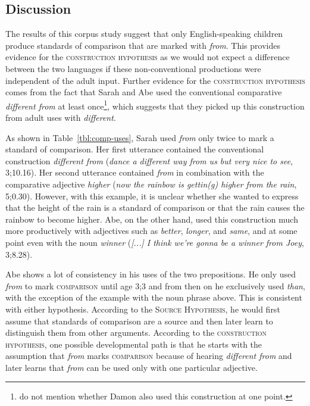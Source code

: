\documentclass[lucida]{sp} %
\begin{document}
\subsection{Discussion}

The results of this corpus study suggest that only English-speaking children produce standards of comparison that are marked with \textit{from}. This provides evidence for the \textsc{construction hypothesis} as we would not expect a difference between the two languages if these non-conventional productions were independent of the adult input. Further evidence for the \textsc{construction hypothesis} comes from the fact that Sarah and Abe used the conventional comparative \textit{different from} at least once\footnote{\cite{clark1989a} do not mention whether Damon also used this construction at one point.}, which suggests that they picked up this construction from adult uses with \textit{different}.

As shown in Table~\ref{tbl:comp-uses}, Sarah used \textit{from} only twice to mark a standard of comparison. Her first utterance contained the conventional construction \textit{different from} (\textit{dance a different way from us but very nice to see}, 3;10.16). Her second utterance contained \textit{from} in combination with the comparative adjective \textit{higher} (\textit{now the rainbow is gettin(g) higher from the rain}, 5;0.30). However, with this example, it is unclear whether she wanted to express that the height of the rain is a standard of comparison or that the rain causes the rainbow to become higher. Abe, on the other hand, used this construction much more productively with adjectives such as \textit{better}, \textit{longer}, and \textit{same}, and at some point even with the noun \textit{winner} (\textit{[...] I think we're gonna be a winner
from Joey}, 3;8.28). 

Abe shows a lot of consistency in his uses of the two prepositions. He only used \textit{from} to mark \textsc{comparison} until age 3;3 and from then on he exclusively used \textit{than}, with the exception of the example with the noun phrase above. This is consistent with either hypothesis. According to the \textsc{Source Hypothesis}, he would first assume that standards of comparison are a source and then later learn to distinguish them from other arguments. According to the \textsc{construction hypothesis}, one possible developmental path is that he starts with the assumption that \textit{from} marks \textsc{comparison} because of hearing \textit{different from} and later learns that \textit{from} can be used only with one particular adjective.
\end{document}
